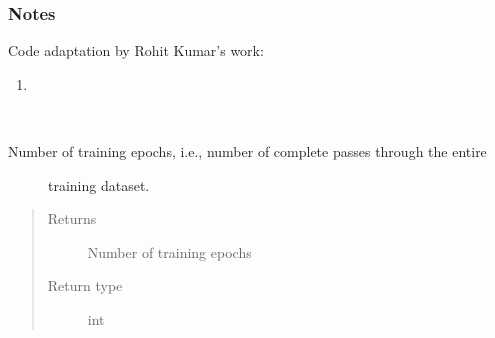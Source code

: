 \documentclass[letterpaper,10pt,english]{sphinxmanual}
\begin{document}
\begin{fulllineitems}
\begin{fulllineitems}
\begin{quote}
\begin{description}
\end{description}\end{quote}
\subsubsection*{Notes}

\sphinxAtStartPar
Code adaptation by Rohit Kumar’s work:
\begin{enumerate}
%
\item {} 
\sphinxAtStartPar
{}

\end{enumerate}

\end{fulllineitems}


\begin{fulllineitems}
\label{\detokenize{code:gpt2_summarizer.GPT2Summarizer.num_train_epochs}}~\begin{description}
\item[{Number of training epochs, i.e., number of complete passes through the entire}] \leavevmode
\sphinxAtStartPar
training dataset.

\end{description}
\begin{quote}\begin{description}
\item[{Returns}] \leavevmode
\sphinxAtStartPar
Number of training epochs

\item[{Return type}] \leavevmode
\sphinxAtStartPar
int

\end{description}\end{quote}

\end{fulllineitems}



\end{fulllineitems}
\end{document}
